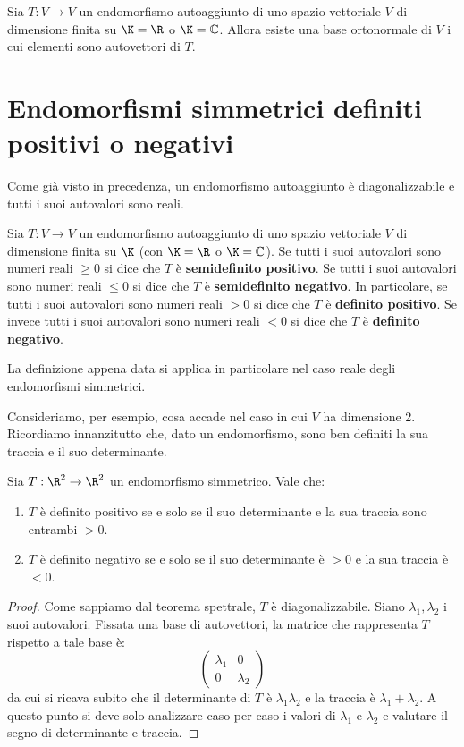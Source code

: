 \begin{theorem}
	Sia $T : V  \to V$ un endomorfismo autoaggiunto di uno spazio vettoriale $V$ di
	dimensione finita su $\K = \R$ o $\K = \mathbb{C}$.
	Allora esiste una base ortonormale di $V$ i cui elementi sono autovettori di $T$.
\end{theorem}


\section{Endomorfismi simmetrici definiti positivi o negativi}
Come già visto in precedenza, un endomorfismo autoaggiunto è diagonalizzabile e
tutti i suoi autovalori sono reali.

\begin{definition}
	Sia $T : V \to V$ un endomorfismo autoaggiunto di uno spazio vettoriale $V$ di
	dimensione finita su $\K$ (con $\K = \R$ o
	$\K = \mathbb{C}$). Se tutti i suoi autovalori sono numeri reali $\geq 0$
	si dice che $T$ è \textbf{semidefinito positivo}. Se tutti i suoi autovalori
	sono numeri reali $\leq 0$ si dice che $T$ è \textbf{semidefinito negativo}.
	In particolare, se tutti i suoi autovalori sono numeri reali $> 0$ si dice che
	$T$ è \textbf{definito positivo}. Se invece tutti i suoi autovalori sono numeri
	reali $< 0$ si dice che $T$ è \textbf{definito negativo}.
\end{definition}

La definizione appena data si applica in particolare nel caso reale degli
endomorfismi simmetrici.

Consideriamo, per esempio, cosa accade nel caso in cui $V$ ha dimensione 2.
Ricordiamo innanzitutto che, dato un endomorfismo, sono ben definiti la sua traccia
e il suo determinante.

\begin{proposition}
	Sia $T : \R^2 \to \R^2$ un endomorfismo simmetrico. Vale che:
	\begin{enumerate}
		\item
		      $T$ è definito positivo se e solo se il suo determinante e la sua
		      traccia sono entrambi $> 0$.
		\item
		      $T$ è definito negativo se e solo se il suo determinante è $> 0$ e
		      la sua traccia è $< 0$.
	\end{enumerate}

	\begin{proof}
		Come sappiamo dal teorema spettrale, $T$ è diagonalizzabile. Siano
		$\lambda_1, \lambda_2$ i suoi autovalori. Fissata una base di autovettori,
		la matrice che rappresenta $T$ rispetto a tale base è:
		\[
			\begin{pmatrix}
				\lambda_1 & 0         \\
				0         & \lambda_2
			\end{pmatrix}
		\]
		da cui si ricava subito che il determinante di $T$ è $\lambda_1 \lambda_2$
		e la traccia è $\lambda_1 + \lambda_2$. A questo punto si deve solo
		analizzare caso per caso i valori di $\lambda_1$ e $\lambda_2$ e valutare
		il segno di determinante e traccia.
	\end{proof}
\end{proposition}


